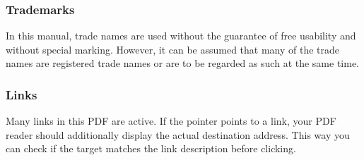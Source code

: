 \subsubsection*{\sffamily{}Trademarks}
\label{sec:Warenzeichen}
In this manual, trade names are used without the guarantee of free
usability and without special marking. However, it can be assumed
that many of the trade names are registered trade names or are to be
regarded as such at the same time.

\subsubsection*{\sffamily{}Links}
\label{sec:Link-liability}
Many links in this PDF are active. If the pointer points to a link,
your PDF reader should additionally display the actual destination
address. This way you can check if the target matches the link
description before clicking.
\endgroup %

